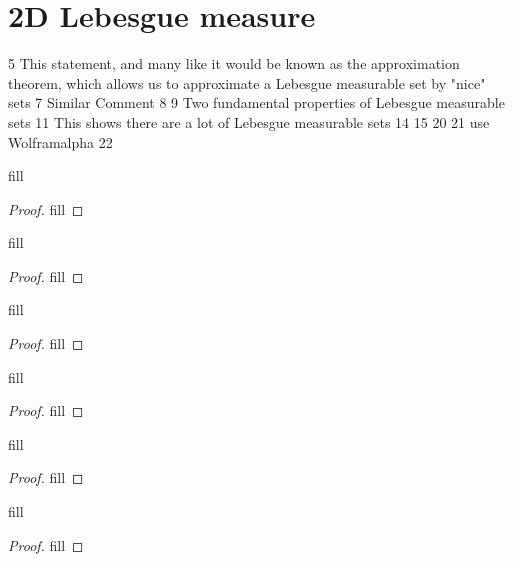 \section{2D Lebesgue measure}

5 This statement, and many like it would be known as the approximation theorem, which allows us to approximate a Lebesgue measurable set by "nice" sets 
7 Similar Comment
8
9 Two fundamental properties of Lebesgue measurable sets 
11 This shows there are a lot of Lebesgue measurable sets
14
15
20
21 use Wolframalpha
22

\begin{exercise}{5}
fill
\end{exercise}
\begin{proof}
fill
\end{proof} 

\begin{exercise}{7}
fill
\end{exercise}
\begin{proof}
fill
\end{proof} 

\begin{exercise}{8}
fill
\end{exercise}
\begin{proof}
fill
\end{proof} 

\begin{exercise}{9}
fill
\end{exercise}
\begin{proof}
fill
\end{proof} 

\begin{exercise}{11}
fill
\end{exercise}
\begin{proof}
fill
\end{proof} 

\begin{exercise}{14}
fill
\end{exercise}
\begin{proof}
fill
\end{proof} 

